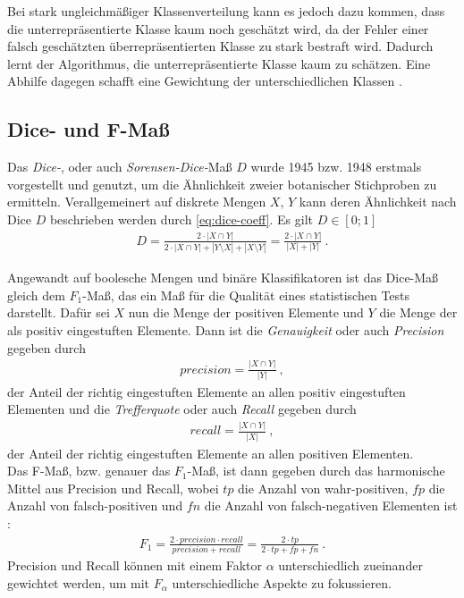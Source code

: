Bei stark ungleichmäßiger Klassenverteilung kann es jedoch dazu kommen, 
dass die unterrepräsentierte Klasse kaum noch geschätzt wird, 
da der Fehler einer falsch geschätzten überrepräsentierten Klasse zu stark bestraft wird.
Dadurch lernt der Algorithmus, die unterrepräsentierte Klasse kaum zu schätzen.
Eine Abhilfe dagegen schafft eine Gewichtung der unterschiedlichen Klassen \cite[S.~4]{Ronneberger.18052015}.

\subsection{Dice- und F-Maß}

Das \textit{Dice-}, oder auch \textit{Sorensen-Dice-}Maß $D$ wurde 1945 bzw. 1948 erstmals vorgestellt und genutzt, um die Ähnlichkeit zweier botanischer Stichproben zu ermitteln. Verallgemeinert auf diskrete Mengen $X$, $Y$ kann deren Ähnlichkeit nach Dice $D$ beschrieben werden durch \autoref{eq:dice-coeff}. Es gilt $D \in [0; 1]$ \cites[S.~33]{Srenson.1948}[S.~297]{Dice.1945} 
\begin{align}
	\label{eq:dice-coeff} D = \frac{2 \cdot | X \cap Y |}{2 \cdot | X \cap Y | + |Y \setminus X| + |X \setminus Y|} 
	=\frac{2 \cdot | X \cap Y |}{|X| + |Y|} ~.
\end{align} 

Angewandt auf boolesche Mengen und binäre Klassifikatoren ist das Dice-Maß gleich dem $F_1$-Maß, das ein Maß für die Qualität eines statistischen Tests darstellt. Dafür sei $X$ nun die Menge der positiven Elemente und $Y$ die Menge der als positiv eingestuften Elemente. Dann ist die \textit{Genauigkeit} oder auch \textit{Precision} gegeben durch
\begin{align}
	\label{eq:precision} precision = \frac{|X \cap Y|}{|Y|}~,
\end{align}
der Anteil der richtig eingestuften Elemente an allen positiv eingestuften Elementen und die \textit{Trefferquote} oder auch \textit{Recall} gegeben durch
\begin{align}
	\label{eq:recall} recall = \frac{|X \cap Y|}{|X|}~,
\end{align}
der Anteil der richtig eingestuften Elemente an allen positiven Elementen. \\
Das F-Maß, bzw. genauer das $F_1$-Maß, ist dann gegeben durch das harmonische Mittel aus Precision und Recall, wobei $tp$ die Anzahl von wahr-positiven, $fp$ die Anzahl von falsch-positiven und $fn$ die Anzahl von falsch-negativen Elementen ist \cite{YutakaSasaki.2007}:
\begin{align}
	\label{eq:f1} F_{1} = \frac{2\cdot precision \cdot recall}{precision + recall} = \frac{2\cdot tp}{2 \cdot tp + fp + fn}~.
\end{align}
Precision und Recall können mit einem Faktor $\alpha$ unterschiedlich zueinander gewichtet werden, um mit $F_{\alpha}$ unterschiedliche Aspekte zu fokussieren. 

